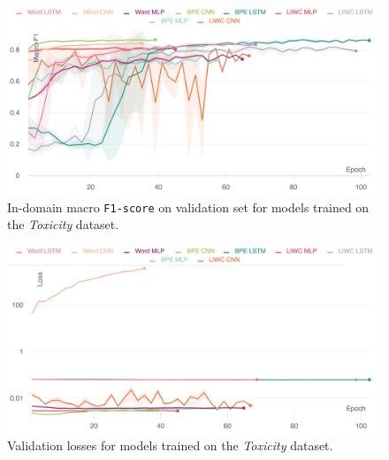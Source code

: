\begin{figure}
    \centering
    \includegraphics[width=\textwidth]{wulczyn_dev_f1.pdf}
    \caption{In-domain macro \texttt{F1-score} on validation set for models trained on the \textit{Toxicity} dataset.}
    \label{fig:wulczyn_dev_f1}
\end{figure}
\begin{figure}
    \centering
    \includegraphics[width=\textwidth]{wulczyn_dev_loss_stderr_logscale.pdf}
    \caption{Validation losses for models trained on the \textit{Toxicity} dataset.}
    \label{fig:wulczyn_dev_loss}
\end{figure}

